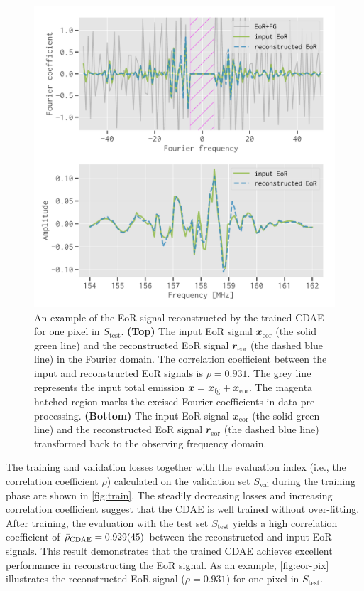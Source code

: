 \documentclass[fleqn,usenatbib]{mnras}
\newcommand{\R}[1]{\mathrm{#1}}
\newcommand{\B}[1]{\mathbfit{#1}}
\begin{document}
\begin{figure}
  \centering
  \includegraphics[width=\columnwidth]{eor-result}
  \caption{\label{fig:eor-pix}%
    An example of the EoR signal reconstructed by the trained CDAE for
    one pixel in $S_{\R{test}}$.
    \textbf{(Top)} The input EoR signal $\B{x}_{\R{eor}}$ (the solid
    green line) and the reconstructed EoR signal $\B{r}_{\R{eor}}$
    (the dashed blue line) in the Fourier domain.
    The correlation coefficient between the input and reconstructed EoR
    signals is $\rho = 0.931$.
    The grey line represents the input total emission
    $\B{x} = \B{x}_{\R{fg}} + \B{x}_{\R{eor}}$.
    The magenta hatched region marks the excised Fourier coefficients
    in data pre-processing.
    \textbf{(Bottom)} The input EoR signal $\B{x}_{\R{eor}}$ (the solid
    green line) and the reconstructed EoR signal $\B{r}_{\R{eor}}$
    (the dashed blue line) transformed back to the observing frequency
    domain.
  }
\end{figure}

The training and validation losses together with the evaluation index
(i.e., the correlation coefficient $\rho$) calculated on the validation set
$S_{\R{val}}$ during the training phase are shown in \autoref{fig:train}.
The steadily decreasing losses and increasing correlation coefficient
suggest that the CDAE is well trained without over-fitting.
After training, the evaluation with the test set $S_{\R{test}}$ yields a
high correlation coefficient of $\bar{\rho}_{\R{CDAE}} = \num{0.929 +- 0.045}$
between the reconstructed and input EoR signals.
This result demonstrates that the trained CDAE achieves excellent
performance in reconstructing the EoR signal.
As an example, \autoref{fig:eor-pix} illustrates the reconstructed EoR
signal ($\rho = 0.931$) for one pixel in $S_{\R{test}}$.
\end{document}

